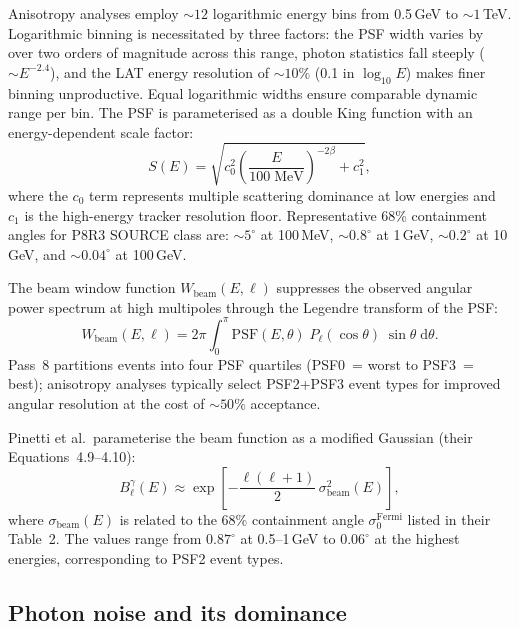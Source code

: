 \documentclass[10pt,a4paper]{article}
\begin{document}
Anisotropy analyses employ $\sim12$ logarithmic energy bins from 0.5\,GeV to $\sim1$\,TeV. Logarithmic binning is necessitated by three factors: the PSF width varies by over two orders of magnitude across this range, photon statistics fall steeply ($\sim E^{-2.4}$), and the LAT energy resolution of $\sim10\%$ (0.1 in $\log_{10}E$) makes finer binning unproductive. Equal logarithmic widths ensure comparable dynamic range per bin. The PSF is parameterised as a double King function with an energy-dependent scale factor:
\begin{equation}
    S(E) = \sqrt{c_0^2\left(\frac{E}{100\;\mathrm{MeV}}\right)^{-2\beta} + c_1^2},
\end{equation}
where the $c_0$ term represents multiple scattering dominance at low energies and $c_1$ is the high-energy tracker resolution floor. Representative 68\% containment angles for P8R3 SOURCE class are: $\sim5^\circ$ at 100\,MeV, $\sim0.8^\circ$ at 1\,GeV, $\sim0.2^\circ$ at 10\,GeV, and $\sim0.04^\circ$ at 100\,GeV.

The beam window function $W_{\mathrm{beam}}(E,\ell)$ suppresses the observed angular power spectrum at high multipoles through the Legendre transform of the PSF:
\begin{equation}
\label{eq:beam}
    W_{\mathrm{beam}}(E,\ell) = 2\pi \int_0^{\pi} \mathrm{PSF}(E,\theta)\;P_\ell(\cos\theta)\;\sin\theta\;\mathrm{d}\theta.
\end{equation}
Pass~8 partitions events into four PSF quartiles (PSF0~= worst to PSF3~= best); anisotropy analyses typically select PSF2+PSF3 event types for improved angular resolution at the cost of $\sim50\%$ acceptance.

Pinetti et al.\ parameterise the beam function as a modified Gaussian (their Equations~4.9--4.10):
\begin{equation}
    B_\ell^\gamma(E) \approx \exp\!\left[-\frac{\ell(\ell+1)}{2}\,\sigma_{\mathrm{beam}}^2(E)\right],
\end{equation}
where $\sigma_{\mathrm{beam}}(E)$ is related to the 68\% containment angle $\sigma_0^{\mathrm{Fermi}}$ listed in their Table~2. The values range from $0.87^\circ$ at 0.5--1\,GeV to $0.06^\circ$ at the highest energies, corresponding to PSF2 event types.

\subsection{Photon noise and its dominance}
\end{document}

